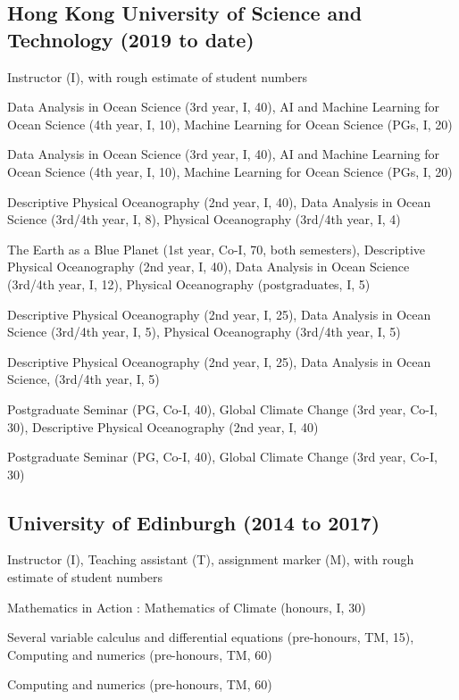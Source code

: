 \documentclass[letterpaper]{article}
\renewenvironment{itemize}{
  \begin{list}{}{
    \setlength{\leftmargin}{1.5em}
  }
}{
  \end{list}
}
\begin{document}
\subsection*{Hong Kong University of Science and Technology (2019 to date)}
\begin{itemize}
\item Instructor (I), with rough estimate of student numbers
\begin{itemize}
  \item[26/27:] Data Analysis in Ocean Science (3rd year, I, 40), AI and Machine Learning for Ocean Science (4th year, I, 10), Machine Learning for Ocean Science (PGs, I, 20)
  \item[25/26:] Data Analysis in Ocean Science (3rd year, I, 40), AI and Machine Learning for Ocean Science (4th year, I, 10), Machine Learning for Ocean Science (PGs, I, 20)
  \item[24/25:] Descriptive Physical Oceanography (2nd year, I, 40), Data Analysis in Ocean Science (3rd/4th year, I, 8), Physical Oceanography (3rd/4th year, I, 4)
  \item[23/24:] The Earth as a Blue Planet (1st year, Co-I, 70, both semesters), Descriptive Physical Oceanography (2nd year, I, 40), Data Analysis in Ocean Science (3rd/4th year, I, 12), Physical Oceanography (postgraduates, I, 5)
  \item[22/23:] Descriptive Physical Oceanography (2nd year, I, 25), Data Analysis in Ocean Science (3rd/4th year, I, 5), Physical Oceanography (3rd/4th year, I, 5)
  \item[21/22:] Descriptive Physical Oceanography (2nd year, I, 25), Data Analysis in Ocean Science, (3rd/4th year, I, 5)
  \item[20/21:] Postgraduate Seminar (PG, Co-I, 40), Global Climate Change (3rd year, Co-I, 30), Descriptive Physical Oceanography (2nd year, I, 40)
  \item[19/20:] Postgraduate Seminar (PG, Co-I, 40), Global Climate Change (3rd year, Co-I, 30)
\end{itemize}
\end{itemize}

\subsection*{University of Edinburgh (2014 to 2017)}
\begin{itemize}
\item Instructor (I), Teaching assistant (T), assignment marker (M), with rough estimate of
student numbers
\begin{itemize}
  \item[16/17:] Mathematics in Action : Mathematics of Climate (honours, I, 30)
	\item[15/16:] Several variable calculus and differential equations
	(pre-honours, TM, 15), Computing and numerics (pre-honours, TM, 60)
	\item[14/15:] Computing and numerics (pre-honours, TM, 60)
\end{itemize}
\end{itemize}
\end{document}
